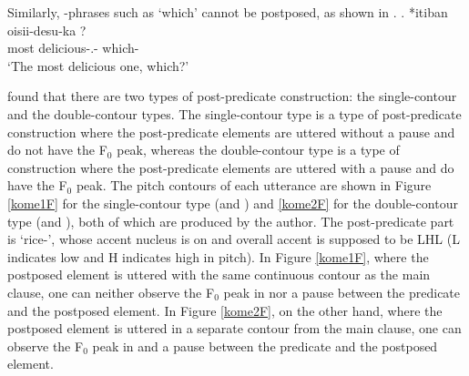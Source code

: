 Similarly,
-phrases such as  `which' cannot be postposed,
as shown in \Next.
%
\exg. *itiban oisii-desu-ka ? \\
		most delicious-.- which- \\
		`The most delicious one, which?'


 found that
there are two types of post-predicate construction:
the single-contour and the double-contour types.
The single-contour type is a type of post-predicate construction
where the post-predicate elements are uttered without a pause and do not have the F$_{0}$ peak,
whereas the double-contour type is a type of construction
where the post-predicate elements are uttered with a pause and do have the F$_{0}$ peak.
The pitch contours of each utterance are shown in Figure \ref{kome1F} for the single-contour type (\Next[A] and \NNext[A]) and \ref{kome2F} for the double-contour type (\Next[A$^{\prime}$] and \NNext[A$^{\prime}$]),
both of which are produced by the author.
The post-predicate part is  `rice-',
whose accent nucleus is on  and overall accent is supposed to be LHL (L indicates low and H indicates high in pitch).
In Figure \ref{kome1F}, where the postposed element is uttered with the same continuous contour as the main clause,
one can neither observe the F$_{0}$ peak in  nor a pause between the predicate and the postposed element.
In Figure \ref{kome2F}, on the other hand,
where the postposed element is uttered in a separate contour from the main clause,
one can observe the F$_{0}$ peak in  and a pause between the predicate and the postposed element.

